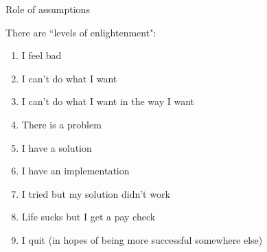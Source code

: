 Role of assumptions 


There are ``levels of enlightenment":
\begin{enumerate}
    \item I feel bad
    \item I can't do what I want
    \item I can't do what I want in the way I want
    \item There is a problem
    \item I have a solution
    \item I have an implementation
    \item I tried but my solution didn't work
    \item Life sucks but I get a pay check
    \item I quit (in hopes of being more successful somewhere else)
\end{enumerate}
